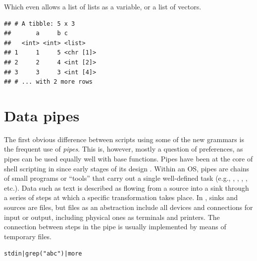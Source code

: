 \documentclass[krantz2]{krantz}\usepackage{knitr}
\begin{document}
Which even allows a list of lists as a variable, or a list of vectors.

\begin{knitrout}\footnotesize
{}\color{fgcolor}\begin{kframe}
\begin{alltt}
\hlstd{(} \hlstd{=} \hlopt{:}\hlstd{,}  \hlstd{=} \hlopt{:}\hlstd{,}  \hlstd{=} \hlstd{(}\hlstd{,} \hlopt{:}\hlstd{,} \hlopt{:}\hlstd{, letters[}\hlopt{:}\hlstd{], letters[}\hlopt{:}\hlstd{]))}
\end{alltt}
\begin{verbatim}
## # A tibble: 5 x 3
##       a     b c        
##   <int> <int> <list>   
## 1     1     5 <chr [1]>
## 2     2     4 <int [2]>
## 3     3     3 <int [4]>
## # ... with 2 more rows
\end{verbatim}
\end{kframe}
\end{knitrout}

\section{Data pipes}\label{sec:data:pipes}
The first obvious difference between scripts using some of the new grammars is the frequent use of \emph{pipes}. This is, however, mostly a question of preferences, as pipes can be used equally well with base \Rlang functions. Pipes have been at the core of shell scripting in  since early stages of its design \autocite{Kernigham1981}. Within an OS, pipes are chains of small programs or ``tools'' that carry out a single well-defined task (e.g., , , , , etc.). Data such as text is described as flowing from a source into a sink through a series of steps at which a specific transformation takes place. In , sinks and sources are files, but files as an abstraction include all devices and connections for input or output, including physical ones as terminals and printers. The connection between steps in the pipe is usually implemented by means of temporary files.

\begin{knitrout}\footnotesize
{}\color{fgcolor}\begin{kframe}
\begin{alltt}
stdin | grep("abc") | more
\end{alltt}
\end{kframe}
\end{knitrout}
\end{document}
